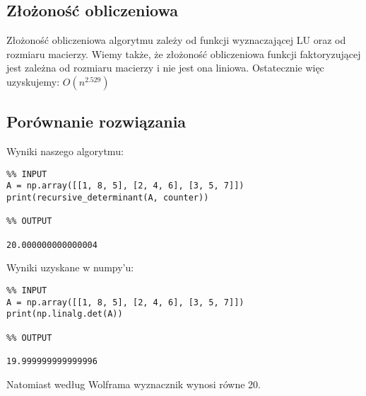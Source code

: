 \documentclass{article}
\begin{document}
\subsection{Złożoność obliczeniowa}

\qquad Złożoność obliczeniowa algorytmu zależy od funkcji wyznaczającej LU oraz od rozmiaru macierzy. Wiemy także, że złożoność obliczeniowa funkcji faktoryzującej jest zależna od rozmiaru macierzy i nie jest ona liniowa. Ostatecznie więc uzyskujemy: $O(n^{2.529})$

\subsection{Porównanie rozwiązania}
Wyniki naszego algorytmu: \\
\begin{lstlisting}
%% INPUT
A = np.array([[1, 8, 5], [2, 4, 6], [3, 5, 7]])
print(recursive_determinant(A, counter))

%% OUTPUT

20.000000000000004
\end{lstlisting} 
Wyniki uzyskane w numpy'u: \\

\begin{lstlisting}
%% INPUT
A = np.array([[1, 8, 5], [2, 4, 6], [3, 5, 7]])
print(np.linalg.det(A))

%% OUTPUT

19.999999999999996
\end{lstlisting}
Natomiast według Wolframa wyznacznik wynosi równe 20.
\end{document}
